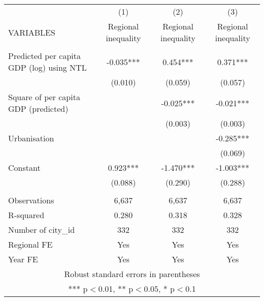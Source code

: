 \documentclass[]{article}
\begin{document}
\begin{tabular}{lccc} \hline
 & (1) & (2) & (3) \\
VARIABLES & Regional inequality & Regional inequality & Regional inequality \\ \hline
 &  &  &  \\
Predicted per capita GDP (log) using NTL & -0.035*** & 0.454*** & 0.371*** \\
 & (0.010) & (0.059) & (0.057) \\
Square of per capita GDP (predicted) &  & -0.025*** & -0.021*** \\
 &  & (0.003) & (0.003) \\
Urbanisation &  &  & -0.285*** \\
 &  &  & (0.069) \\
Constant & 0.923*** & -1.470*** & -1.003*** \\
 & (0.088) & (0.290) & (0.288) \\
 &  &  &  \\
Observations & 6,637 & 6,637 & 6,637 \\
R-squared & 0.280 & 0.318 & 0.328 \\
Number of city\_id & 332 & 332 & 332 \\
Regional FE & Yes & Yes & Yes \\
 Year FE & Yes & Yes & Yes \\ \hline
\multicolumn{4}{c}{ Robust standard errors in parentheses} \\
\multicolumn{4}{c}{ *** p$<$0.01, ** p$<$0.05, * p$<$0.1} \\
\end{tabular}
\end{document}
